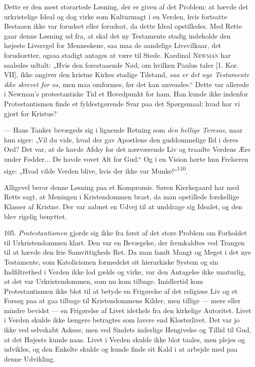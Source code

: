 \documentclass[12pt,a4paper,openany]{book}
\newcommand{\opage}[1]{\marginnote{\footnotesize\textit{[#1]}}}
\begin{document}
Dette er den mest storartede Løsning, der er given af det Problem: at
hævde det urkristelige Ideal og dog virke som Kulturmagt i en Verden,
hvis fortsatte Bestaaen ikke var forudset eller forudsat, da dette Ideal
opstilledes. Med Rette gaar denne Løsning ud fra, at skal det ny
Testamente stadig indeholde den højeste Livsregel for Menneskene, saa
maa de aandelige Livsvilkaar, det forudsætter, ogsaa stadigt antages at
være til Stede. Kardinal \textsc{Newman} har saaledes udtalt: „Hvis den
forestaaende Nød, om hvilken Paulus taler [1. Kor. VII], ikke angiver
den kristne Kirkes stadige Tilstand, \textit{saa er det nye Testamente
ikke skrevet for os,} men maa omformes, før det kan anvendes.“ Dette var
allerede i Newman’s protestantiske Tid et Hovedpunkt for ham. Han kunde
ikke indenfor Protestantismen finde et fyldestgørende Svar paa det
Spørgsmaal: hvad har vi gjort for Kristus?

--- Hans Tanker bevægede sig i lignende Retning som \textit{den hellige
Teresas,} naar hun siger: „Vil du vide, hvad der gav Apostlene den
guddommelige Ild i deres Ord? Det var, at de havde Afsky for det
nærværende Liv og traadte Verdens Ære under Fødder... De havde vovet Alt
for Gud.“ Og i en Vision hørte hun Frelseren sige: „Hvad vilde Verden
blive, hvis der ikke var Munke!“\textsuperscript{110}.

Alligevel beror denne Løsning paa et Kompromis. Søren Kierkegaard har
med Rette sagt, at Meningen i Kristendommen brast, da man opstillede
forskellige Klasser af Kristne. Der var aabnet en Udvej til at unddrage
sig Idealet, og den blev rigelig benyttet.

105. \textit{Protestantismen} gjorde sig ikke fra først af det store
Problem om Forholdet til Urkristendommen klart. Den var en Bevægelse,
der fremkaldtes ved Trangen til at hævde den frie Samvittigheds Ret. Da
man fandt Mangt og Meget i det nye Testamente, som Katolicismen
formedelst sit hierarkiske System og sin Indfiltrethed i Verden ikke lod
gælde og virke, var den Antagelse ikke unaturlig, at det var
Urkristendommen, som nu kom tilbage. Imidlertid kom Protestantismen ikke
blot til at betyde en Frigørelse af det religiøse Liv og et Forsøg paa
at gaa tilbage til Kristendommens Kilder, men tillige --- mere eller
mindre bevidst --- en Frigørelse af Livet idethele fra den kirkelige
Autoritet. Livet i Verden skulde ikke længere betragtes som lavere end
Klosterlivet. Det var jo ikke ved selvskabt Askese, men
\opage{234}ved Sindets inderlige Hengivelse og Tillid til Gud, at det
Højeste kunde naas. Livet i Verden skulde ikke blot taales, men plejes
og udvikles, og den Enkelte skulde og kunde finde sit Kald i at arbejde
med paa denne Udvikling.
\end{document}
